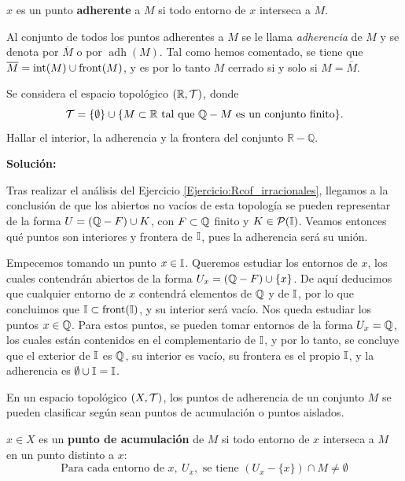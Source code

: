 \hypertarget{def:punto_adherencia}{}
\begin{deff}
    $x$ es un punto \textbf{adherente} a $M$ si todo entorno de $x$ interseca a $M$.
\end{deff}
Al conjunto de todos los puntos adherentes a $M$ se le llama \textit{adherencia} de $M$ y se denota por $\overline{M}$ o por $\operatorname{adh}(M)$. Tal como hemos comentado, se tiene que $\overline{M} = \operatorname{int}(M) \cup \operatorname{front}(M)$, y es por lo tanto $M$ cerrado si y solo si $M = \overline{M}$.

\begin{ex}
    Se considera el espacio topológico \((\mathbb{R}, \mathcal{T})\), donde
    \[
        \mathcal{T} = \{\emptyset\} \cup \{M \subset \mathbb{R} \text{ tal que } \mathbb{Q} - M \text{ es un conjunto finito}\}.
    \]
    Hallar el interior, la adherencia y la frontera del conjunto \(\mathbb{R} - \mathbb{Q}\).

    \bigskip

    {\bf Solución:}

    Tras realizar el análisis del Ejercicio \ref{Ejercicio:Rcof_irracionales}, llegamos a la conclusión de que los abiertos no vacíos de esta topología se pueden representar de la forma $U = (\mathbb{Q} - F) \cup K$, con $F \subset \mathbb{Q}$ finito y $K \in \mathcal{P}(\mathbb{I})$. Veamos entonces qué puntos son interiores y frontera de $\mathbb{I}$, pues la adherencia será su unión.

    Empecemos tomando un punto $x\in\mathbb{I}$. Queremos estudiar los entornos de $x$, los cuales contendrán abiertos de la forma $U_x = (\mathbb{Q} - F) \cup \{x\}$. De aquí deducimos que cualquier entorno de $x$ contendrá elementos de $\mathbb{Q}$ y de $\mathbb{I}$, por lo que concluimos que $\mathbb{I} \subset \operatorname{front}(\mathbb{I})$, y su interior será vacío. Nos queda estudiar los puntos $x\in\mathbb{Q}$. Para estos puntos, se pueden tomar entornos de la forma $U_x = \mathbb{Q}$, los cuales están contenidos en el complementario de $\mathbb{I}$, y por lo tanto, se concluye que el exterior de $\mathbb{I}$ es $\mathbb{Q}$, su interior es vacío, su frontera es el propio $\mathbb{I}$, y la adherencia es $\emptyset \cup \mathbb{I} = \mathbb{I}$.
\end{ex}

\bigskip

En un espacio topológico $(X,\mathcal{T})$, los puntos de adherencia de un conjunto $M$ se pueden clasificar según sean puntos de acumulación o puntos aislados.

\begin{deff}
    $x\in X$ es un {\bf punto de acumulación} de $M$ si todo entorno de $x$ interseca a $M$ en un punto distinto a $x$:
    \[\text{Para cada entorno de } x, \ U_x, \text{ se tiene } (U_x -\{x\}) \cap M \neq \emptyset \]
\end{deff}

